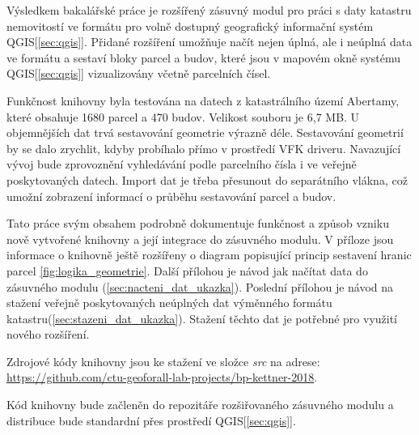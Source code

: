 Výsledkem bakalářské práce je rozšířený zásuvný modul pro práci s daty
katastru nemovitostí ve formátu  pro volně dostupný
geografický informační systém QGIS[\ref{sec:qgis}]. Přidané rozšíření umožňuje načít
nejen úplná, ale i neúplná data ve formátu  a sestaví bloky
parcel a budov, které jsou v mapovém okně systému QGIS[\ref{sec:qgis}] vizualizovány
včetně parcelních čísel.

Funkčnost knihovny byla testována na datech z katastrálního území
Abertamy, které obsahuje 1680 parcel a 470 budov. Velikost 
souboru je 6,7 MB. U objemnějších dat trvá sestavování geometrie
výrazně déle. Sestavování geometrií by se dalo zrychlit, kdyby probíhalo přímo v
prostředí VFK driveru. Navazující vývoj bude zprovoznění vyhledávání podle parcelního čísla i ve veřejně poskytovaných datech. Import dat je třeba přesunout do separátního vlákna, což umožní zobrazení informací o průběhu sestavování parcel a budov.

Tato práce svým obsahem podrobně dokumentuje funkčnost a způsob vzniku
nově vytvořené knihovny a její integrace do zásuvného modulu. V příloze jsou informace o knihovně ještě
rozšířeny o diagram popisující princip sestavení hranic
parcel \ref{fig:logika_geometrie}. Další přílohou je návod jak
načítat data do zásuvného modulu (\ref{sec:nacteni_dat_ukazka}). Poslední přílohou je návod na stažení
veřejně poskytovaných neúplných dat výměnného formátu
katastru(\ref{sec:stazeni_dat_ukazka}). Stažení těchto dat je potřebné pro využití nového rozšíření.

Zdrojové kódy knihovny jsou ke stažení ve složce \textit{src} na adrese: \href{https://github.com/ctu-geoforall-lab-projects/bp-kettner-2018}{https://github.com/ctu-geoforall-lab-projects/bp-kettner-2018}.

Kód knihovny bude začleněn do repozitáře rozšiřovaného zásuvného modulu a distribuce bude standardní přes prostředí QGIS[\ref{sec:qgis}].
